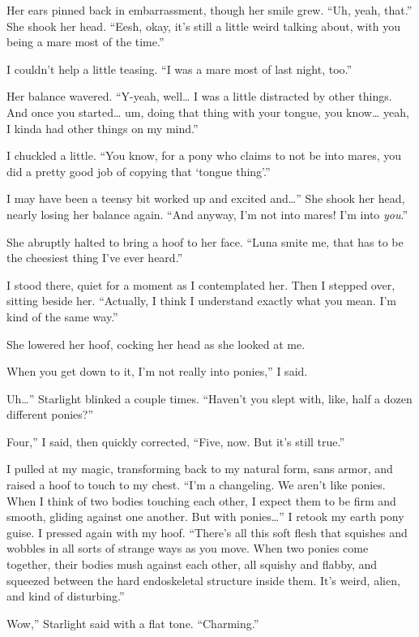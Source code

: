 Her ears pinned back in embarrassment, though her smile grew. “Uh, yeah, that.” She shook her head. “Eesh, okay, it’s still a little weird talking about, with you being a mare most of the time.”

I couldn’t help a little teasing. “I was a mare most of last night, too.”

Her balance wavered. “Y-yeah, well… I was a little distracted by other things. And once you started… um, doing that thing with your tongue, you know… yeah, I kinda had other things on my mind.”

I chuckled a little. “You know, for a pony who claims to not be into mares, you did a pretty good job of copying that ‘tongue thing’.”

\leavevmode{}I may have been a teensy bit worked up and excited and…” She shook her head, nearly losing her balance again. “And anyway, I’m not into mares! I’m into \textit{you}.”

She abruptly halted to bring a hoof to her face. “Luna smite me, that has to be the cheesiest thing I’ve ever heard.”

I stood there, quiet for a moment as I contemplated her. Then I stepped over, sitting beside her. “Actually, I think I understand exactly what you mean. I’m kind of the same way.”

She lowered her hoof, cocking her head as she looked at me.

\leavevmode{}When you get down to it, I’m not really into ponies,” I said.

\leavevmode{}Uh…” Starlight blinked a couple times. “Haven’t you slept with, like, half a dozen different ponies?”

\leavevmode{}Four,” I said, then quickly corrected, “Five, now. But it’s still true.”

I pulled at my magic, transforming back to my natural form, sans armor, and raised a hoof to touch to my chest. “I’m a changeling. We aren’t like ponies. When I think of two bodies touching each other, I expect them to be firm and smooth, gliding against one another. But with ponies…” I retook my earth pony guise. I pressed again with my hoof. “There’s all this soft flesh that squishes and wobbles in all sorts of strange ways as you move. When two ponies come together, their bodies mush against each other, all squishy and flabby, and squeezed between the hard endoskeletal structure inside them. It’s weird, alien, and kind of disturbing.”

\leavevmode{}Wow,” Starlight said with a flat tone. “Charming.”

